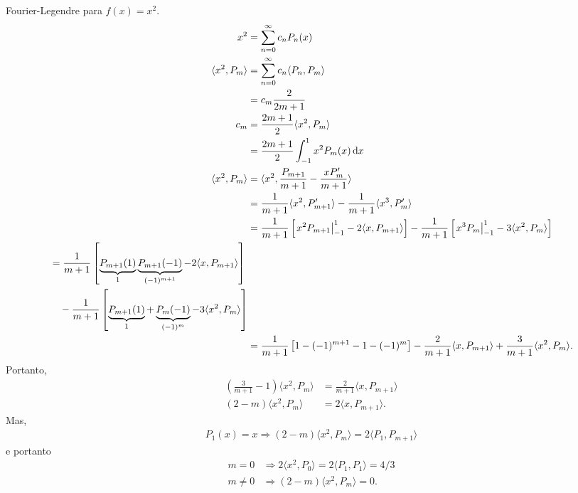 \begin{exem}
    Fourier-Legendre para $f(x) = x^2$.
    \begin{align*}
        x^2 &= \sum_{n = 0}^\infty c_n P_n(x) \\
        \langle x^2, P_m \rangle &= \sum_{n = 0}^\infty c_n \langle P_n, P_m \rangle \\
        &= c_m \frac{2}{2m + 1} \\
        c_m &= \frac{2m + 1}{2} \langle x^2, P_m \rangle \\
        &= \frac{2m + 1}{2} \int_{-1}^1 x^2 P_m(x) \, \mathrm{d}x \\
        \langle x^2, P_m \rangle &= \langle x^2, \frac{P_{m + 1}}{m + 1} - \frac{x P_m'}{m + 1} \rangle \\
        &= \frac{1}{m + 1} \langle x^2, P_{m + 1}' \rangle - \frac{1}{m + 1} \langle x^3, P_m' \rangle \\
        &= \frac{1}{m + 1} \left[ \left. x^2 P_{m + 1} \right|_{-1}^1 - 2 \langle x, P_{m + 1} \rangle \right] - \frac{1}{m + 1} \left[ \left. x^3 P_m \right|_{-1}^1 - 3 \langle x^2, P_m \rangle \right] \\
        \begin{split}
            &= \frac{1}{m + 1} \left[ \underbrace{P_{m + 1}(1)}_{1} \underbrace{P_{m + 1}(-1)}_{(-1)^{m + 1}} - 2 \langle x, P_{m + 1} \rangle \right] \\
            &\quad {}- \frac{1}{m + 1} \left[ \underbrace{P_{m + 1}(1)}_{1} + \underbrace{P_m(-1)}_{(-1)^m} - 3 \langle x^2, P_m \rangle \right]
        \end{split} \\
        &= \frac{1}{m + 1} \left[ 1 - (-1)^{m + 1} - 1 - (-1)^m \right] - \frac{2}{m + 1} \langle x, P_{m + 1} \rangle + \frac{3}{m + 1} \langle x^2, P_m \rangle.
    \end{align*}
    Portanto,
    \begin{align*}
        \left( \frac{3}{m + 1} - 1 \right) \langle x^2, P_m \rangle &= \frac{2}{m + 1} \langle x, P_{m + 1} \rangle \\
        \left( 2 - m \right) \langle x^2, P_m \rangle &= 2 \langle x, P_{m + 1} \rangle.
    \end{align*}
    Mas,
    \begin{align*}
        P_1(x) = x \Rightarrow \left( 2 - m \right) \langle x^2, P_m \rangle = 2 \langle P_1, P_{m + 1} \rangle
    \end{align*}
    e portanto
    \begin{align*}
        m = 0 &\Rightarrow 2 \langle x^2, P_0 \rangle = 2 \langle P_1, P_1 \rangle = 4 / 3 \\
        m \neq 0 &\Rightarrow \left( 2 - m \right) \langle x^2, P_m \rangle = 0.
    \end{align*}
\end{exem}

